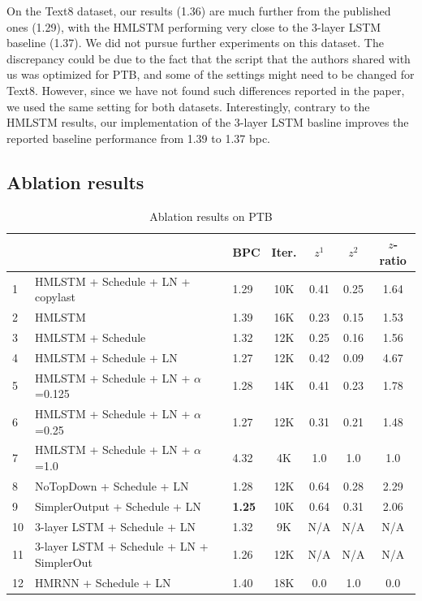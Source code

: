 On the Text8 dataset, our results (1.36) are 
much further from the published ones (1.29), with the HMLSTM performing very close to
the 3-layer LSTM baseline (1.37).
We did not pursue further experiments on this dataset. 
The discrepancy could be due to the fact that the script that 
the authors shared with us was optimized for PTB, and some of 
the settings might need to be changed for Text8. However, 
since we have not found such differences reported in the paper, we used the same setting for both datasets.
Interestingly, contrary to the HMLSTM results, our implementation of
the 3-layer LSTM basline improves the reported baseline performance from 1.39 to 1.37 bpc.

\subsection{Ablation results}

\begin{table}[ht]
\centering
\begin{tabular}{lllcccc}
                        & & BPC & Iter. & $z^1$ & $z^2$ & $z$-ratio\\
\hline 
\hline
1 & HMLSTM + Schedule + LN + copylast      & 1.29   & 10K & 0.41 & 0.25 & 1.64 \\
\hline 
2 & HMLSTM                  & 1.39   & 16K	& 0.23 & 0.15 & 1.53 \\
3 & HMLSTM + Schedule      	& 1.32   & 12K	& 0.25 & 0.16 & 1.56\\
4 & HMLSTM + Schedule + LN  & 1.27 & 12K  & 0.42 & 0.09 & 4.67 \\
\hline 
5 & HMLSTM + Schedule + LN + $\alpha$=0.125 & 1.28  & 14K & 0.41 & 0.23 & 1.78\\
6 & HMLSTM + Schedule + LN + $\alpha$=0.25  & 1.27  & 12K & 0.31 & 0.21 & 1.48 \\
7 & HMLSTM + Schedule + LN + $\alpha$=1.0    & 4.32  &  4K & 1.0 & 1.0 & 1.0 \\
\hline 
8 & NoTopDown + Schedule + LN  		&  1.28 & 12K & 0.64 & 0.28 & 2.29\\
9 & SimplerOutput + Schedule + LN   &  {\bf 1.25}    & 10K & 0.64 & 0.31 & 2.06 \\
\hline 
10 & 3-layer LSTM + Schedule + LN   		       &  1.32    & 9K & N/A & N/A & N/A\\
11 & 3-layer LSTM + Schedule + LN + SimplerOut &  1.26    & 12K & N/A & N/A & N/A\\
12 & HMRNN + Schedule + LN   		&  1.40    & 18K & 0.0 & 1.0 & 0.0\\
\hline 
\hline 
\end{tabular}
\caption{Ablation results on PTB}
\label{tab:ablation}
\end{table}

